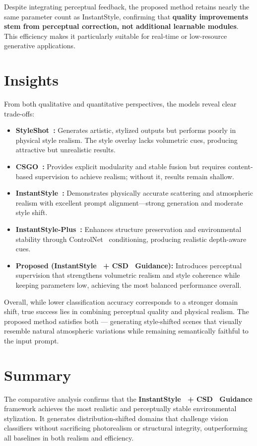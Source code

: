 \noindent
Despite integrating perceptual feedback, the proposed method retains nearly the same parameter count as InstantStyle, confirming that \textbf{quality improvements stem from perceptual correction, not additional learnable modules}.  
This efficiency makes it particularly suitable for real-time or low-resource generative applications.

\section{Insights}
\label{sec:discussion_overall}

From both qualitative and quantitative perspectives, the models reveal clear trade-offs:
\begin{itemize}
    \item \textbf{StyleShot~\cite{gao2024styleshot}:} Generates artistic, stylized outputs but performs poorly in physical style realism. The style overlay lacks volumetric cues, producing attractive but unrealistic results.
    \item \textbf{CSGO~\cite{xing2024csgocomp}:} Provides explicit modularity and stable fusion but requires content-based supervision to achieve realism; without it, results remain shallow.
    \item \textbf{InstantStyle~\cite{wang2024instantstyle}:} Demonstrates physically accurate scattering and atmospheric realism with excellent prompt alignment—strong generation and moderate style shift.
    \item \textbf{InstantStyle-Plus~\cite{wang2024instantstyleplus}:} Enhances structure preservation and environmental stability through ControlNet~\cite{zhang2023controlnet} conditioning, producing realistic depth-aware cues.
    \item \textbf{Proposed (InstantStyle~\cite{wang2024instantstyle} + CSD~\cite{somepalli2024csd} Guidance):} Introduces perceptual supervision that strengthens volumetric realism and style coherence while keeping parameters low, achieving the most balanced performance overall.
\end{itemize}

Overall, while lower classification accuracy corresponds to a stronger domain shift, true success lies in combining perceptual quality and physical realism.  
The proposed method satisfies both — generating style-shifted scenes that visually resemble natural atmospheric variations while remaining semantically faithful to the input prompt.

\section{Summary}
\label{sec:comparison_summary}

The comparative analysis confirms that the \textbf{InstantStyle~\cite{wang2024instantstyle} + CSD~\cite{somepalli2024csd} Guidance} framework achieves the most realistic and perceptually stable environmental stylization.  
It generates distribution-shifted domains that challenge vision classifiers without sacrificing photorealism or structural integrity, outperforming all baselines in both realism and efficiency.
